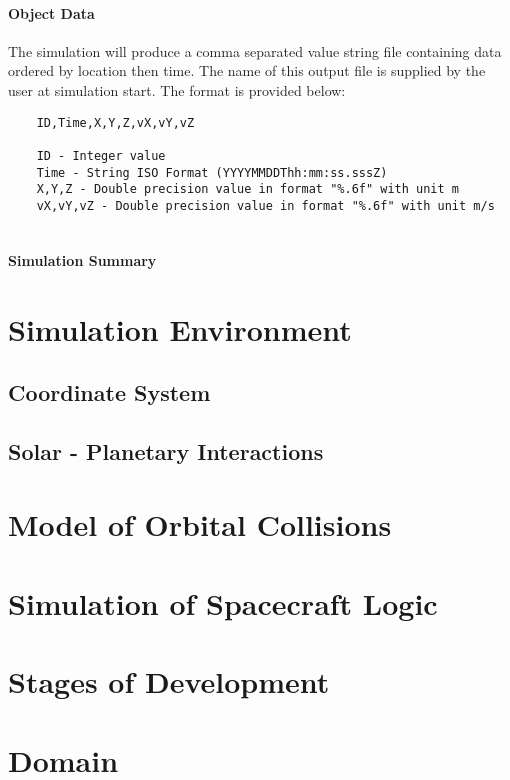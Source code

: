 \documentclass{article}
\begin{document}
  \paragraph{Object Data}
  
  The simulation will produce a comma separated value string file containing data ordered by location then time. The name of this output file is supplied by the user at simulation start. The format is provided below:
  
  \begin{verbatim}
  	ID,Time,X,Y,Z,vX,vY,vZ
  	
  	ID - Integer value
  	Time - String ISO Format (YYYYMMDDThh:mm:ss.sssZ)
  	X,Y,Z - Double precision value in format "%.6f" with unit m
  	vX,vY,vZ - Double precision value in format "%.6f" with unit m/s  	
  	
  \end{verbatim}
  
  \paragraph{Simulation Summary}
  
  \section{Simulation Environment}  
  
  \subsection{Coordinate System}
  
  \subsection{Solar - Planetary Interactions}
   
  \section{Model of Orbital Collisions}
  
  \section{Simulation of Spacecraft Logic}
  
  \section{Stages of Development}
  
  \section{Domain}
  
  
\end{document}
